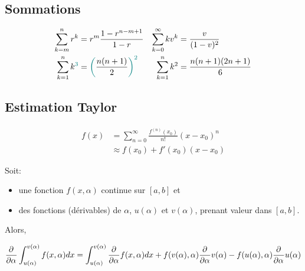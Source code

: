 \documentclass[10pt, french]{article}
\begin{document}
\begin{multicols*}{2}
\begin{center}
\begin{tikzpicture}[x=0.75pt,y=0.75pt,yscale=-1,xscale=1]
\end{tikzpicture}
\end{center}


\subsection*{Sommations}
\begin{align*}
\sum_{k = m}^{n} r^k &= r^{m} \frac{1 - r^{n - m + 1}}{1 - r} &
\sum_{k = 0}^{\infty}k v^k &= \frac{v}{(1 - v)^2} \\
\sum_{k = 1}^{n}k^{\textcolor{teal}{3}} &= \textcolor{teal}{\bigg(}\frac{n(n + 1)}{2}\textcolor{teal}{\bigg)^{2}} &
\sum_{k = 1}^{n}k^2 &= \frac{n(n + 1)(2n + 1)}{6} \\
\end{align*}

\subsection*{Estimation Taylor}
\begin{align*}
	f(x) 
		&=	\sum_{n = 0}^{\infty} \frac{f^{(n)}(x_0)}{n!}(x - x_0)^{n} \\
		&\approx f(x_0) + f'(x_0) (x - x_0)
\end{align*}

\begin{definitionNOHFILL}
Soit: 
\begin{itemize}
	\item 	une fonction $f(x, \alpha)$ continue sur $[a, b]$ et
	\item des fonctions (dérivables) de $\alpha$, $u(\alpha)$ et $v(\alpha)$, prenant valeur dans $[a, b]$.
\end{itemize}
Alors,

	\setlength{\mathindent}{-.24cm}
\begin{equation*}
	\deriv{\alpha}{} \int_{u(\alpha)}^{v(\alpha)} f(x, \alpha) dx = 
	\int_{u(\alpha)}^{v(\alpha)} \deriv{\alpha}{}  f(x, \alpha) dx + f(v(\alpha), \alpha) \deriv{\alpha}{} v(\alpha) - f(u(\alpha), \alpha) \deriv{\alpha}{} u(\alpha)
\end{equation*}
	\setlength{\mathindent}{1cm}
\end{definitionNOHFILL}


\end{multicols*}
\end{document}

